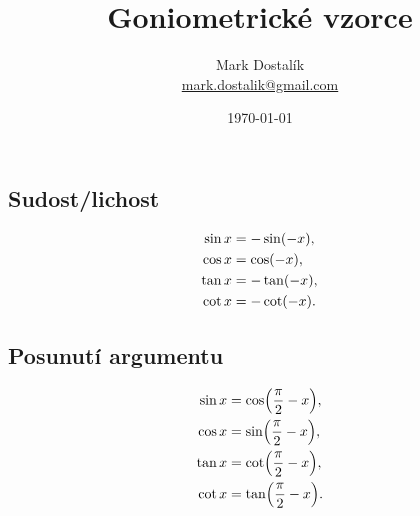 \documentclass[columns=2]{cheatsheet}
\title{Goniometrické vzorce\footnotemark}
\author{Mark Dostal\'{i}k \\ \href{mailto:mark.dostalik@gmail.com}{mark.dostalik@gmail.com}}
\date{\today}
\begin{document}
\maketitle
{}
\subsection{Sudost/lichost}
\begin{align*}
  \sin x 
  &= 
  - \sin \parens{-x},
  \\
  \cos x
  &=
  \cos \parens{-x},
  \\
  \tan x
  &=
  - \tan \parens{-x},
  \\
  \cot x
  &=
  - \cot \parens{-x}.
\end{align*}

\subsection{Posunutí argumentu}
\begin{align*}
  \sin x 
  &= 
  \cos \parens{\frac{\pi}{2} - x},
  \\
  \cos x
  &=
  \sin \parens{\frac{\pi}{2} - x},
  \\
  \tan x
  &=
  \cot \parens{\frac{\pi}{2} - x},
  \\
  \cot x
  &=
  \tan \parens{\frac{\pi}{2} - x}.
\end{align*}
\end{document}
